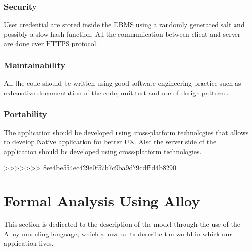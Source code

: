 \documentclass[a4paper, 12pt, oneside]{article}
\begin{document}
\begin{enumerate}[labelindent=20pt, label={UC.\arabic*}, itemindent=1em,leftmargin=!]
\subsubsection{Security}
User credential are stored inside the DBMS using a randomly generated salt and possibly a slow hash function. All the communication between client and server are done over HTTPS protocol.  
\subsubsection{Maintainability}
All the code should be written using good software engineering practice such as exhaustive documentation of the code, unit test and use of design patterns.
\subsubsection{Portability}
The application should be developed using cross-platform technologies that allows to develop Native application for better UX.
Also the server side of the application should be developed using cross-platform technologies.

>>>>>>> 8ee4be554ec429e0f57b7c9ba9d79cdf5d4b8290
\newpage
\section{Formal Analysis Using Alloy}
\label{analysisAndAlloy}
This section is dedicated to the description of the model through the use of the Alloy modeling language, which allows us to describe the world in which our application lives.


\end{enumerate}
\end{document}
